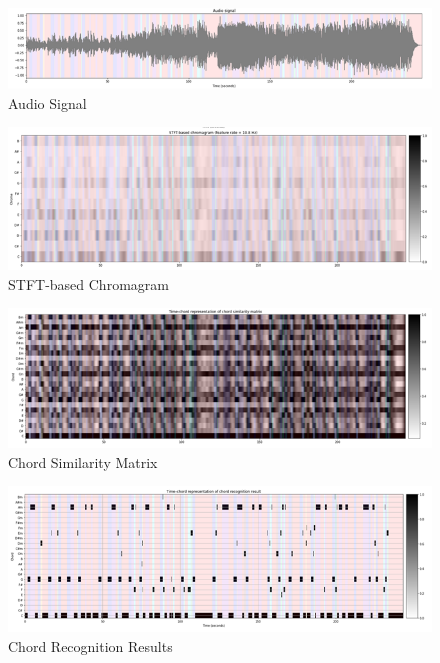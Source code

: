 \documentclass[
	12pt, %
]{fphw}
\begin{document}
\begin{figure}[H]
 \centering
 \includegraphics[scale=1]{./images/1_audio_signal.png}
 \caption{Audio Signal}
\end{figure}

\begin{figure}[H]
 \centering
 \includegraphics[scale=1]{./images/1_stft_chromagram.png}
 \caption{STFT-based Chromagram}
\end{figure}

\begin{figure}[H]
 \centering
 \includegraphics[scale=1]{./images/1_chord_similarity.png}
 \caption{Chord Similarity Matrix}
\end{figure}

\begin{figure}[H]
 \centering
 \includegraphics[scale=1]{./images/1_recognition_results.png}
 \caption{Chord Recognition Results}
\end{figure}
\end{document}
